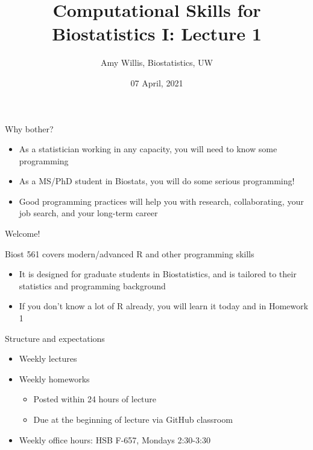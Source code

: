 \documentclass[ignorenonframetext,]{beamer}
\title{Computational Skills for Biostatistics I: Lecture 1}
\author{Amy Willis, Biostatistics, UW}
\date{07 April, 2021}
\providecommand{\tightlist}{%
  \setlength{\itemsep}{0pt}\setlength{\parskip}{0pt}}
\begin{document}
\frame{\titlepage}

\begin{frame}{Why bother?}
\protect\hypertarget{why-bother}{}

\begin{itemize}
\tightlist
\item
  As a statistician working in any capacity, you will need to know some
  programming
\item
  As a MS/PhD student in Biostats, you will do some serious programming!
\item
  Good programming practices will help you with research, collaborating,
  your job search, and your long-term career
\end{itemize}

\end{frame}

\begin{frame}{Welcome!}
\protect\hypertarget{welcome}{}

Biost 561 covers modern/advanced R and other programming skills

\begin{itemize}
\tightlist
\item
  It is designed for graduate students in Biostatistics, and is tailored
  to their statistics and programming background
\item
  If you don't know a lot of R already, you will learn it today and in
  Homework 1
\end{itemize}

\end{frame}

\begin{frame}{Structure and expectations}
\protect\hypertarget{structure-and-expectations}{}

\begin{itemize}
\tightlist
\item
  Weekly lectures
\item
  Weekly homeworks

  \begin{itemize}
  \tightlist
  \item
    Posted within 24 hours of lecture
  \item
    Due at the beginning of lecture via GitHub classroom
  \end{itemize}
\item
  Weekly office hours: HSB F-657, Mondays 2:30-3:30
\end{itemize}

\end{frame}
\end{document}
